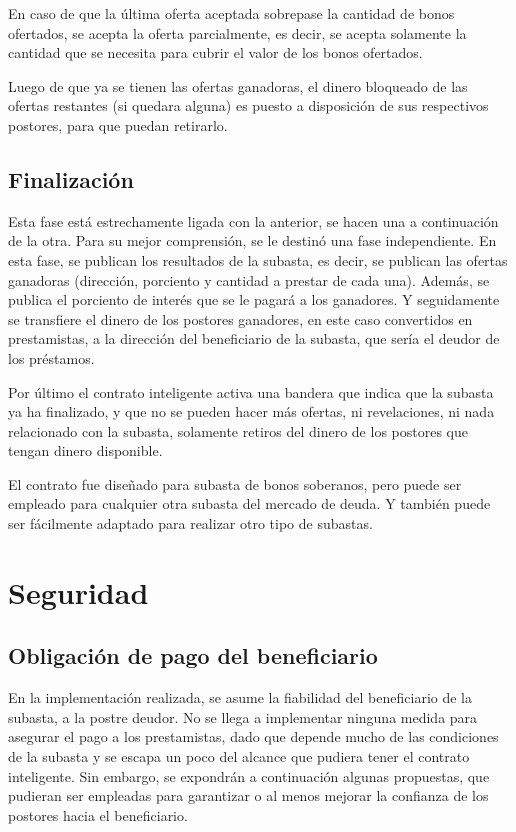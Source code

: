     En caso de que la última oferta aceptada sobrepase la cantidad de bonos ofertados, se acepta la oferta parcialmente, es decir, se
    acepta solamente la cantidad que se necesita para cubrir el valor de los bonos ofertados.

    Luego de que ya se tienen las ofertas ganadoras, el dinero bloqueado de las ofertas restantes (si quedara alguna) es puesto a 
    disposición de sus respectivos postores, para que puedan retirarlo.

    \subsection{Finalización}
    Esta fase está estrechamente ligada con la anterior, se hacen una a continuación de la otra. Para su mejor comprensión, se le destinó una fase independiente. En esta fase, se publican los resultados de la subasta, es decir, se publican las ofertas ganadoras (dirección, porciento y cantidad a prestar de cada una). Además, se publica el porciento de interés que se le pagará a los ganadores. Y seguidamente se transfiere el dinero de los postores ganadores, en este caso convertidos en prestamistas, a la dirección del beneficiario de la subasta, que sería el deudor de los préstamos.

    Por último el contrato inteligente activa una bandera que indica que la subasta ya ha finalizado, y que no se pueden hacer más
    ofertas, ni revelaciones, ni nada relacionado con la subasta, solamente retiros del dinero de los postores que tengan dinero disponible.

    El contrato fue diseñado para subasta de bonos soberanos, pero puede ser empleado para cualquier otra subasta del mercado de deuda.
    Y también puede ser fácilmente adaptado para realizar otro tipo de subastas.

\section{Seguridad}
  \subsection{Obligación de pago del beneficiario}
    En la implementación realizada, se asume la fiabilidad del beneficiario de la subasta, a la postre deudor. No se llega a implementar ninguna medida para asegurar el pago a los prestamistas, dado que depende mucho de las condiciones de la subasta y se escapa un poco del alcance que pudiera tener el contrato inteligente. Sin embargo, se expondrán a continuación algunas propuestas, que pudieran ser empleadas para garantizar o al menos mejorar la confianza de los postores hacia el beneficiario.

